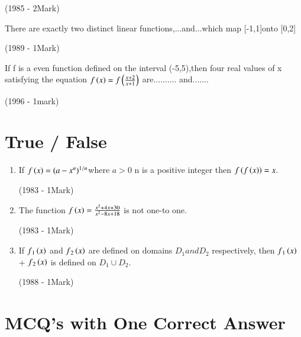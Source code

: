 \documentclass[journal]{IEEEtran}
\begin{document}
\begin{enumerate}
{    
    \hfill
    {(1985 - 2Mark)}
    
     
    \item There are exactly two distinct linear functions,...and...which map [-1,1]onto [0,2]
    
    \hfill
    {(1989 - 1Mark)}
    
    
    
     \item If f is a even function defined on the 
    interval (-5,5),then four real values of x 
    satisfying the equation $f\left(x\right)=f\left({\frac{x+2}{x+1}}\right)$
    are.......... and.......
    
    
    \hfill   (1996 - 1mark)
    }
\end{enumerate}





\section{ True / False}




\begin{enumerate}

\item If  $f\left(x\right)=(a-x^n)^{1/n}$where $a>0$ n is a positive integer 
then $f\left(f\left(x\right)\right)=x.$


 \hfill 
 {(1983 - 1Mark)}


 
\item The function $f\left(x\right)={\frac{x^2+4x+30}{x^2-8x+18}}$ is not one-to one.


\hfill
{(1983 - 1Mark)}




\item If $f{_1}\left(x\right)$
 and  $f{_2}\left(x\right)$ are  defined on domains $D{_1} and D{_2}$ respectively, then $f{_1}\left(x\right)$ + $f{_2}\left(x\right)$ is defined on $D{_1}\cup D{_2}$.


\hfill
{(1988 - 1Mark)}
\end{enumerate}




\section{ MCQ's with One Correct Answer}



 
\end{document}
